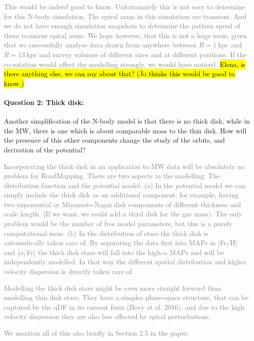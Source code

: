 \documentclass[10pt,a4paper]{article}
\newcommand{\Answer}[1]{\textcolor{Gray}{#1}}
\begin{document}
\Answer{This would be indeed good to know. Unfortunately this is not easy to determine for this N-body simulation. The spiral arms in this simulation are transient. And we do not have enough simulation snapshots to determine the pattern speed of these transient spiral arms. We hope however, that this is not a huge issue, given that we successfully analyse data drawn from anywhere between $R=1~\text{kpc}$ and $R=13~\text{kpc}$ and survey volumes of different sizes and at different positions. If the co-rotation would affect the modelling strongly, we would have noticed.} \hl{Elena, is there anything else, we can say about that? (Jo thinks this would be good to know.)}

\paragraph{Question 2: Thick disk:} Another simplification of the N-body model is that there is no thick disk, while in
the MW, there is one which is about comparable mass to the thin disk. How will the
presence of this other components change the study of the orbits, and derivation of
the potential?

\Answer{Incorporating the thick disk in an application to MW data will be absolutely no problem for RoadMapping. There are two aspects in the modelling: The distribution function and the potential model. (a) In the potential model we can simply include the thick disk as an additional component, for example, having two exponential or Miyamoto-Nagai disk components of different thickness and scale length. (If we want, we could add a third disk for the gas mass). The only problem would be the number of free model parameters, but this is a purely computational issue. (b) In the distribution of stars the thick disk is automatically taken care of. By separating the data first into MAPs in [Fe/H] and [$\alpha$/Fe] the thick disk stars will fall into the high-$\alpha$ MAPs and will be independently modelled. In that way the different spatial distribution and higher velocity dispersion is directly taken care of.}

\Answer{Modelling the thick disk stars might be even more straight forward than modelling thin disk stars: They have a simpler phase-space structure, that can be captured by the qDF in its current form (Bovy et al. 2016), and due to the high velocity dispersion they are also less affected by spiral perturbations.}

\Answer{We mention all of this also briefly in Section 2.5 in the paper.}
\end{document}
